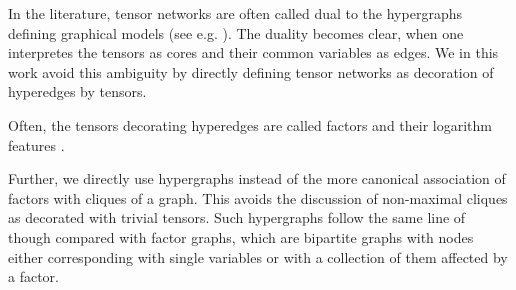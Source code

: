 \begin{remark}
	In the literature, tensor networks are often called dual to the hypergraphs defining graphical models (see e.g. \cite{robeva_duality_2019}).
	The duality becomes clear, when one interpretes the tensors as cores and their common variables as edges.
	We in this work avoid this ambiguity by directly defining tensor networks as decoration of hyperedges by tensors.
	
	Often, the tensors decorating hyperedges are called factors and their logarithm features \cite{koller_probabilistic_2009}.
	
	Further, we directly use hypergraphs instead of the more canonical association of factors with cliques of a graph.
	This avoids the discussion of non-maximal cliques as decorated with trivial tensors.
	Such hypergraphs follow the same line of though compared with factor graphs, which are bipartite graphs with nodes either corresponding with single variables or with a collection of them affected by a factor.
\end{remark}







